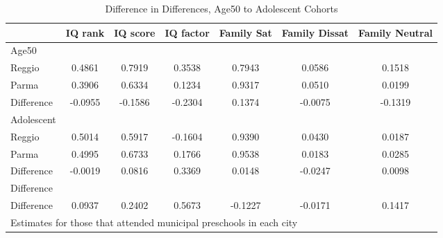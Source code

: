 \begin{table}[htbp]\centering
\caption{Difference in Differences, Age50 to Adolescent Cohorts}
\begin{tabular}{l*{6}{c}}
\hline\hline
            &     IQ rank&    IQ score&   IQ factor&  Family Sat&Family Dissat&Family Neutral\\
\hline
Age50       &            &            &            &            &            &            \\
Reggio      &      0.4861&      0.7919&      0.3538&      0.7943&      0.0586&      0.1518\\
Parma       &      0.3906&      0.6334&      0.1234&      0.9317&      0.0510&      0.0199\\
Difference  &     -0.0955&     -0.1586&     -0.2304&      0.1374&     -0.0075&     -0.1319\\
\hline
Adolescent  &            &            &            &            &            &            \\
Reggio      &      0.5014&      0.5917&     -0.1604&      0.9390&      0.0430&      0.0187\\
Parma       &      0.4995&      0.6733&      0.1766&      0.9538&      0.0183&      0.0285\\
Difference  &     -0.0019&      0.0816&      0.3369&      0.0148&     -0.0247&      0.0098\\
\hline
Difference  &            &            &            &            &            &            \\
Difference  &      0.0937&      0.2402&      0.5673&     -0.1227&     -0.0171&      0.1417\\
\hline\hline
\multicolumn{7}{l}{\footnotesize Estimates for those that attended municipal preschools in each city}\\
\end{tabular}
\end{table}
